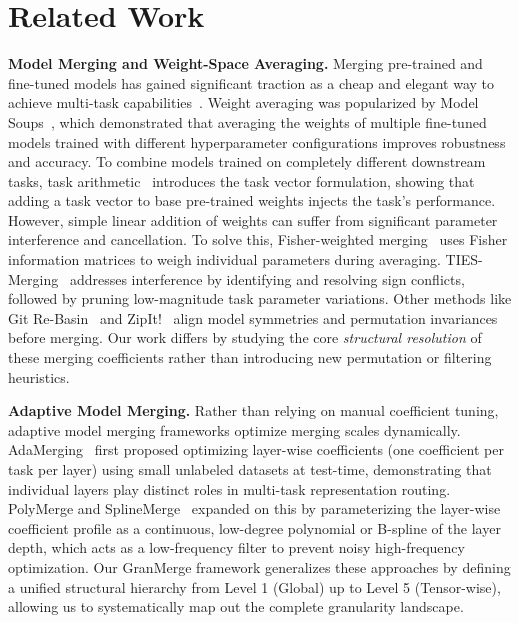 \section{Related Work}
\label{sec:related}

\textbf{Model Merging and Weight-Space Averaging.} 
Merging pre-trained and fine-tuned models has gained significant traction as a cheap and elegant way to achieve multi-task capabilities~\cite{wortsman2022model,choshen2022fusing}. 
Weight averaging was popularized by Model Soups~\cite{wortsman2022model}, which demonstrated that averaging the weights of multiple fine-tuned models trained with different hyperparameter configurations improves robustness and accuracy. 
To combine models trained on completely different downstream tasks, task arithmetic~\cite{ilharco2022task} introduces the task vector formulation, showing that adding a task vector to base pre-trained weights injects the task's performance. 
However, simple linear addition of weights can suffer from significant parameter interference and cancellation. 
To solve this, Fisher-weighted merging~\cite{matena2022merging} uses Fisher information matrices to weigh individual parameters during averaging. 
TIES-Merging~\cite{yadav2023ties} addresses interference by identifying and resolving sign conflicts, followed by pruning low-magnitude task parameter variations. 
Other methods like Git Re-Basin~\cite{ainsworth2023git} and ZipIt!~\cite{zhang2023zipit} align model symmetries and permutation invariances before merging. 
Our work differs by studying the core \emph{structural resolution} of these merging coefficients rather than introducing new permutation or filtering heuristics.

\textbf{Adaptive Model Merging.} 
Rather than relying on manual coefficient tuning, adaptive model merging frameworks optimize merging scales dynamically. 
AdaMerging~\cite{yang2024adamerging} first proposed optimizing layer-wise coefficients (one coefficient per task per layer) using small unlabeled datasets at test-time, demonstrating that individual layers play distinct roles in multi-task representation routing. 
PolyMerge and SplineMerge~\cite{jung2025poly} expanded on this by parameterizing the layer-wise coefficient profile as a continuous, low-degree polynomial or B-spline of the layer depth, which acts as a low-frequency filter to prevent noisy high-frequency optimization. 
Our GranMerge framework generalizes these approaches by defining a unified structural hierarchy from Level 1 (Global) up to Level 5 (Tensor-wise), allowing us to systematically map out the complete granularity landscape.

